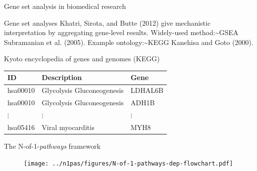 \documentclass[ignorenonframetext,aspectratio=169,]{beamer}
\begin{document}
\begin{frame}{%
\protect\hypertarget{gene-set-analysis-in-biomedical-research}{%
Gene set analysis in biomedical research}}

Gene set analyses Khatri, Sirota, and Butte (2012) give mechanistic
interpretation by aggregating gene-level results. Widely-used
method:\textasciitilde{}GSEA Subramanian et al. (2005). Example
ontology:\textasciitilde{}KEGG Kanehisa and Goto (2000).

\begin{block}{Kyoto encyclopedia of genes and genomes (KEGG)}

\begin{table}
         \begin{tabular}{lll}
           ID & Description & Gene\\
           \hline
           hsa00010 & Glycolysis Gluconeogenesis & LDHAL6B\\
           hsa00010 & Glycolysis Gluconeogenesis & ADH1B\\
           $\vdots$ & $\vdots$ & $\vdots$\\
           hsa05416 & Viral myocarditis & MYH8\\
         \end{tabular}
\end{table}

\end{block}

\end{frame}

\begin{frame}{%
\protect\hypertarget{the-n-of-1-pathways-framework}{%
The N-of-1-\emph{pathways} framework}}

\begin{figure}[htb]
    \centering
\texttt{[image: ../n1pas/figures/N-of-1-pathways-dep-flowchart.pdf]}
\end{figure}

\end{frame}
\end{document}
